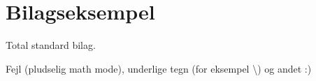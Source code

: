 \chapter{Bilagseksempel}

Total standard bilag.

Fejl (pludselig math mode), underlige tegn (for eksempel \textbackslash) og andet :)